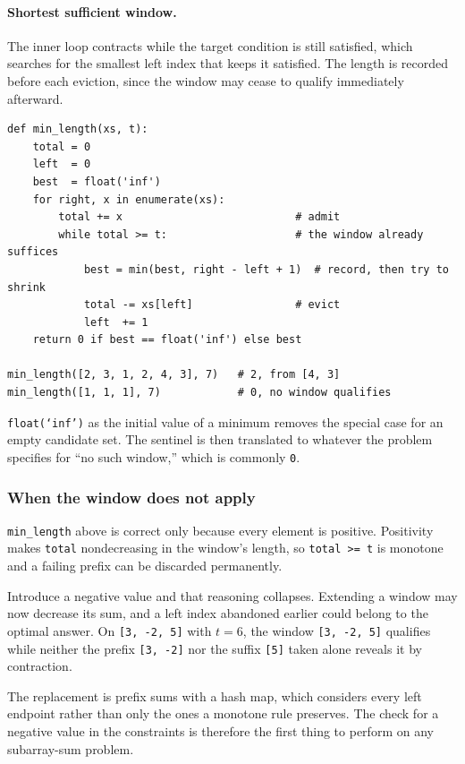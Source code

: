 \paragraph{Shortest sufficient window.} The inner loop contracts while the
target condition is still satisfied, which searches for the smallest left index
that keeps it satisfied. The length is recorded before each eviction, since the
window may cease to qualify immediately afterward.

\begin{lstlisting}[style=python, caption={Shortest subarray with sum at least t, over positive values}]
def min_length(xs, t):
    total = 0
    left  = 0
    best  = float('inf')
    for right, x in enumerate(xs):
        total += x                           # admit
        while total >= t:                    # the window already suffices
            best = min(best, right - left + 1)  # record, then try to shrink
            total -= xs[left]                # evict
            left  += 1
    return 0 if best == float('inf') else best

min_length([2, 3, 1, 2, 4, 3], 7)   # 2, from [4, 3]
min_length([1, 1, 1], 7)            # 0, no window qualifies
\end{lstlisting}

\vspace{-2ex}
\texttt{float(`inf')} as the initial value of a minimum removes the special case
for an empty candidate set. The sentinel is then translated to whatever the
problem specifies for ``no such window,'' which is commonly \texttt{0}.

\subsubsection*{When the window does not apply}

\begin{keybox}
\texttt{min\_length} above is correct only because every element is positive.
Positivity makes \texttt{total} nondecreasing in the window's length, so
\texttt{total >= t} is monotone and a failing prefix can be discarded
permanently.

Introduce a negative value and that reasoning collapses. Extending a window may
now decrease its sum, and a left index abandoned earlier could belong to the
optimal answer. On \texttt{[3, -2, 5]} with $t = 6$, the window
\texttt{[3, -2, 5]} qualifies while neither the prefix \texttt{[3, -2]} nor the
suffix \texttt{[5]} taken alone reveals it by contraction.

The replacement is prefix sums with a hash map, which considers every left
endpoint rather than only the ones a monotone rule preserves. The check for a
negative value in the constraints is therefore the first thing to perform on any
subarray-sum problem.
\end{keybox}

